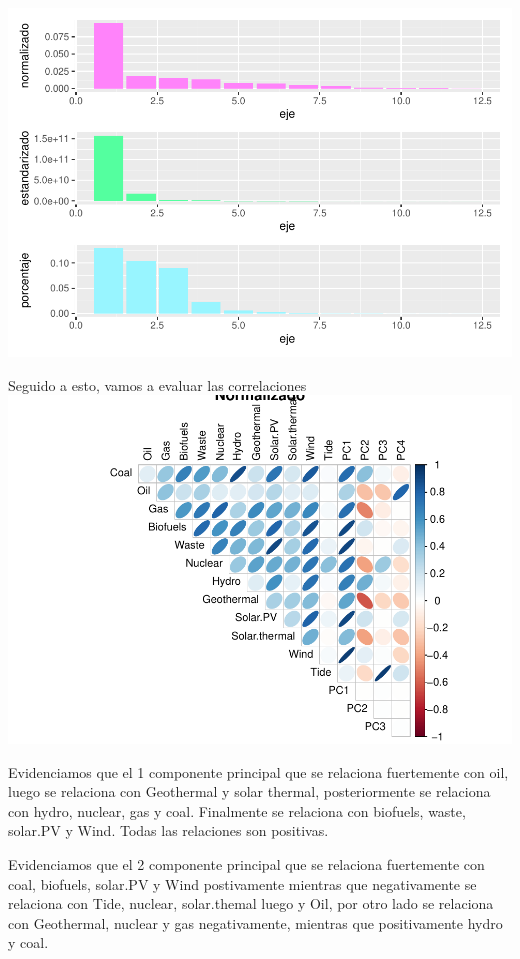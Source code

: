 \documentclass[
]{article}
\begin{document}
\includegraphics{AMTV_Docum_Consolidado_files/figure-latex/unnamed-chunk-18-1.pdf}

Seguido a esto, vamos a evaluar las correlaciones
\includegraphics{AMTV_Docum_Consolidado_files/figure-latex/unnamed-chunk-19-1.pdf}

Evidenciamos que el 1 componente principal que se relaciona fuertemente
con oil, luego se relaciona con Geothermal y solar thermal,
posteriormente se relaciona con hydro, nuclear, gas y coal. Finalmente
se relaciona con biofuels, waste, solar.PV y Wind. Todas las relaciones
son positivas.

Evidenciamos que el 2 componente principal que se relaciona fuertemente
con coal, biofuels, solar.PV y Wind postivamente mientras que
negativamente se relaciona con Tide, nuclear, solar.themal luego y Oil,
por otro lado se relaciona con Geothermal, nuclear y gas negativamente,
mientras que positivamente hydro y coal.
\end{document}
